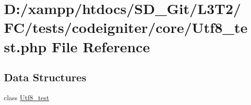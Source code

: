 \hypertarget{_utf8__test_8php}{}\section{D\+:/xampp/htdocs/\+S\+D\+\_\+\+Git/\+L3\+T2/\+F\+C/tests/codeigniter/core/\+Utf8\+\_\+test.php File Reference}
\label{_utf8__test_8php}
\subsection*{Data Structures}
\begin{DoxyCompactItemize}
\item 
class \hyperlink{class_utf8__test}{Utf8\+\_\+test}
\end{DoxyCompactItemize}
